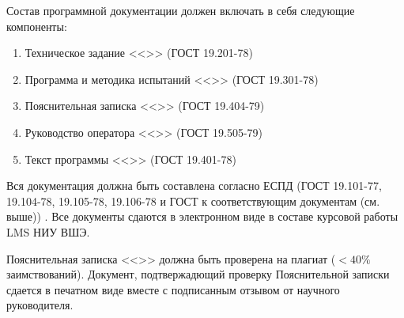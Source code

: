 Состав программной документации должен включать в себя следующие компоненты:
\begin{enumerate}
	\item Техническое задание <<>> (ГОСТ 19.201-78) \label{tz}
	\item Программа и методика испытаний <<>> (ГОСТ 19.301-78) \label{pmi}
	\item Пояснительная записка <<>> (ГОСТ 19.404-79) \label{pz}
	\item Руководство оператора <<>> (ГОСТ 19.505-79) \label{ro}
	\item Текст программы <<>> (ГОСТ 19.401-78) \label{tp}
\end{enumerate}

\indent
Вся документация должна быть составлена согласно ЕСПД (ГОСТ 19.101-77, 19.104-78, 19.105-78, 19.106-78 и ГОСТ к соответствующим документам (см. выше)) \cite{gost}. Все документы сдаются в электронном виде в составе курсовой работы LMS НИУ ВШЭ.

Пояснительная записка <<>> должна быть проверена на плагиат ($< 40\% $ заимствований). Документ, подтвержадющий проверку Пояснительной записки сдается в печатном виде вместе с подписанным отзывом от научного руководителя.
